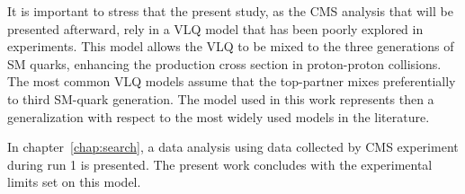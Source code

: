 It is important to stress that the present study, as the CMS analysis that will be presented afterward, rely in a VLQ model that has been poorly explored in experiments. This model allows the VLQ to be mixed to the three generations of SM quarks, enhancing the production cross section in proton-proton collisions. The most common VLQ models assume that the top-partner mixes preferentially to third SM-quark generation. The model used in this work represents then a generalization with respect to the most widely used models in the literature.

In chapter~\ref{chap:search}, a data analysis using data collected by CMS experiment during run 1 is presented. The present work concludes with the experimental limits set on this model.

